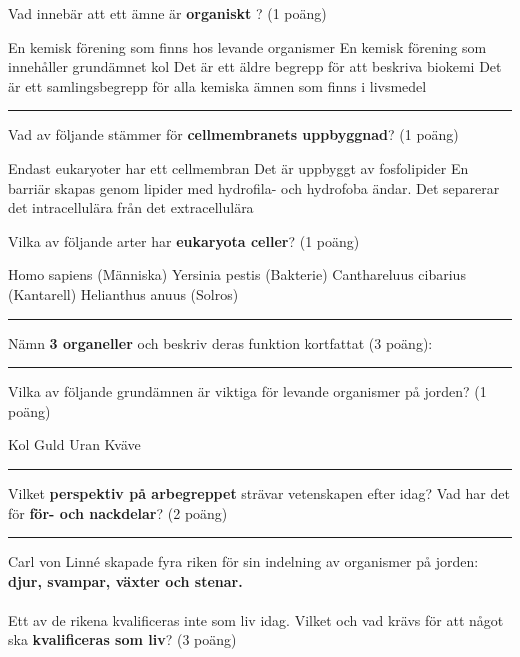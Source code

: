 \documentclass{exam}
\begin{document}
\begin{questions}
\question Vad innebär att ett ämne är \textbf{organiskt} ? (1 poäng)
\begin{checkboxes}
   \choice En kemisk förening som finns hos levande organismer
   \choice En kemisk förening som innehåller grundämnet kol
   \choice Det är ett äldre begrepp för att beskriva biokemi
   \choice Det är ett samlingsbegrepp för alla kemiska ämnen som finns i livsmedel
\end{checkboxes}
\vspace{5mm} 
\hrule 
\vspace{5mm} 
\question Vad av följande stämmer för \textbf{cellmembranets uppbyggnad}? (1 poäng)
\begin{checkboxes}
   \choice Endast eukaryoter har ett cellmembran
   \choice Det är uppbyggt av fosfolipider
   \choice En barriär skapas genom lipider med hydrofila- och hydrofoba ändar.
   \choice Det separerar det intracellulära från det extracellulära
\end{checkboxes}

\break
\vspace{5mm} 
\vspace{5mm}
\question Vilka av följande arter har \textbf{eukaryota celler}? (1 poäng)
\begin{checkboxes}
   \choice Homo sapiens (Människa)
   \choice Yersinia pestis (Bakterie)
   \choice Canthareluus cibarius (Kantarell)
   \choice Helianthus anuus (Solros)
\end{checkboxes}

\vspace{5mm} 
\hrule 
\vspace{5mm} 

\question Nämn \textbf{3 organeller} och beskriv deras funktion kortfattat (3 poäng):
\vspace{30mm} 
\hrule 
\vspace{5mm}
\question 
Vilka av följande grundämnen är viktiga för levande organismer på jorden? (1 poäng)
\begin{checkboxes}
   \choice Kol
   \choice Guld
   \choice Uran
   \choice Kväve
\end{checkboxes}
\vspace{5mm}
\hrule 
\vspace{5mm}
\question Vilket \textbf{perspektiv på arbegreppet} strävar vetenskapen efter idag? Vad har det för \textbf{för- och nackdelar}? (2 poäng)
\vspace{20mm}
\hrule 
\vspace{5mm}
\question
Carl von Linné skapade fyra riken för sin indelning av organismer på jorden: \textbf{djur, svampar, växter och stenar.}
\\ \\
Ett av de rikena kvalificeras inte som liv idag. Vilket och vad krävs för att något ska \textbf{kvalificeras som liv}? (3 poäng)

\break


\end{questions}
\end{document}
